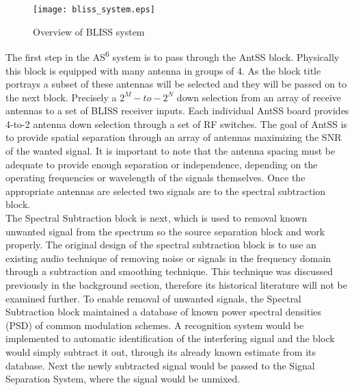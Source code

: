 \begin{figure}[!ht]\label{bliss_system}
\hspace{0.2in}
\texttt{[image: bliss\_system.eps]}
\caption{Overview of BLISS system }
\end{figure}

The first step in the AS\textsuperscript{6} system is to pass through the AntSS block.  Physically this block is equipped with many antenna in groups of 4.  As the block title portrays a subset of these antennas will be selected and they will be passed on to the next block.  Precisely a \(2^{M}-to-2^{N}\) down selection from an array of receive antennas to a set of BLISS receiver inputs. Each individual AntSS board provides 4-to-2 antenna down selection through a set of RF switches.  The goal of AntSS is to provide spatial separation through an array of antennas maximizing the SNR of the wanted signal.  It is important to note that the antenna spacing must be adequate to provide enough separation or independence, depending on the operating frequencies or wavelength of the signals themselves.  Once the appropriate antennas are selected two signals are to the spectral subtraction block.\\

The Spectral Subtraction block is next, which is used to removal known unwanted signal from the spectrum so the source separation block and work properly.  The original design of the spectral subtraction block is to use an existing audio technique of removing noise or signals in the frequency domain through a subtraction and smoothing technique.  This technique was discussed previously in the background section, therefore its historical literature will not be examined further.  To enable removal of unwanted signals, the Spectral Subtraction block maintained a database of known power spectral densities (PSD) of common modulation schemes.  A recognition system would be implemented to automatic identification of the interfering signal and the block would simply subtract it out, through its already known estimate from its database.  Next the newly subtracted signal would be passed to the Signal Separation System, where the signal would be unmixed.\\

